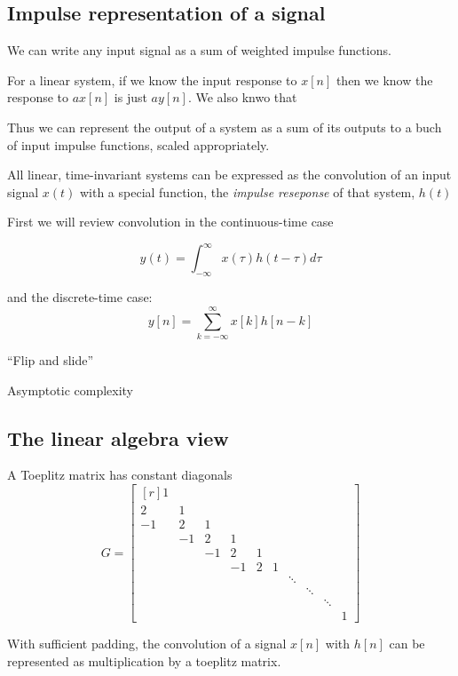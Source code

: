 \subsection{Impulse representation of a signal}
We can write any input signal as a sum of weighted impulse
functions. 

For a linear system, if we know the input response to $x[n]$ then we
know the response to $ax[n]$ is just $ay[n]$. We also 
knwo that 

Thus we can represent the output of a system as a
sum of its outputs to a buch of input impulse functions,
scaled appropriately. 







All linear, time-invariant systems can be expressed as the 
convolution of an input signal $x(t)$ with a special function, 
the \textit{impulse reseponse} of that system, $h(t)$

First we will review convolution in the continuous-time
case

\[
y(t) = \int_{-\infty}^{\infty} x(\tau) h(t - \tau) d\tau
\]

and the discrete-time case:
\[
y[n] = \sum_{k=-\infty}^{\infty} x[k] h[n -k]
\]


``Flip and slide'' 

Asymptotic complexity 

\subsection{The linear algebra view}
A Toeplitz matrix has constant diagonals
\[ %
 G = 
 \begin{bmatrix*}[r]
    1 \\
    2&1\\
   -1&2&1\\
     &-1&2&1\\
     &&-1&2&1\\
     &&&-1&2&1\\
     &&&&&&\ddots\\
     &&&&&&&\ddots\\
     &&&&&&&&\ddots\\
     &&&&&&&&&1
  \end{bmatrix*}
\]

With sufficient padding, the convolution of a signal $x[n]$ with
$h[n]$ can be represented as multiplication by a toeplitz matrix. 


